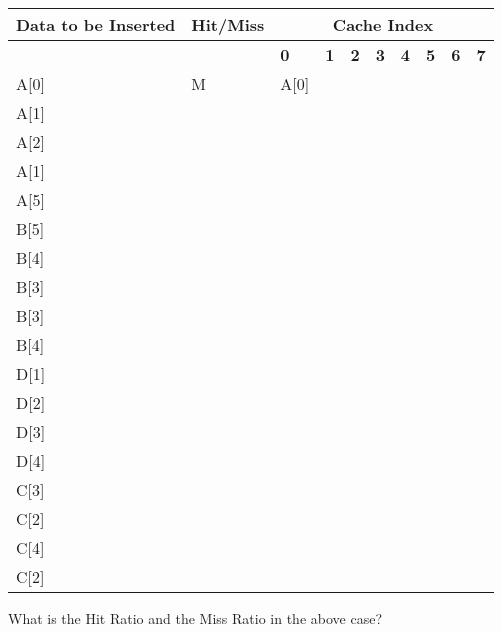 \documentclass[addpoints]{exam}
\begin{document}
\begin{sloppypar}
\begin{questions}
    \begin{tabular}{|m{15mm} | m{17mm} | m{8.5mm} |m{8.5mm} |m{8.5mm} |m{8.5mm} |m{8.5mm} |m{8.5mm} |m{8.5mm} |m{8.5mm} |}
        \hline
        \raggedright\textbf{Data to \hspace*{3.5mm} be Inserted} &\raggedright \textbf{Hit/Miss} & \multicolumn{8}{|c|}{\textbf{Cache Index}} \\ \hline 
        & & \hspace*{3mm}\textbf{0} & \hspace*{3mm}\textbf{1} & \hspace*{3mm}\textbf{2} & \hspace*{3mm}\textbf{3} & \hspace*{3mm}\textbf{4} & \hspace*{3mm}\textbf{5} & \hspace*{3mm}\textbf{6} & \hspace*{3mm}\textbf{7} \\ \hline
        A[0] & M & A[0] & & & & & & & \\ \hline
        A[1] & & & & & & & & &\\ \hline
        A[2] & & & & & & & & &\\ \hline
        A[1] & & & & & & & & &\\ \hline
        A[5] & & & & & & & & &\\ \hline
        B[5] & & & & & & & & &\\ \hline
        B[4] & & & & & & & & &\\ \hline
        B[3] & & & & & & & & &\\ \hline
        B[3] & & & & & & & & &\\ \hline
        B[4] & & & & & & & & &\\ \hline
        D[1] & & & & & & & & &\\ \hline
        D[2] & & & & & & & & &\\ \hline
        D[3] & & & & & & & & &\\ \hline
        D[4] & & & & & & & & &\\ \hline
        C[3] & & & & & & & & &\\ \hline
        C[2] & & & & & & & & &\\ \hline
        C[4] & & & & & & & & &\\ \hline
        C[2] & & & & & & & & &\\ \hline
    \end{tabular}

    What is the Hit Ratio and the Miss Ratio in the above case?
    \begin{solution}
        

\end{solution}
\end{questions}
\end{sloppypar}
\end{document}

